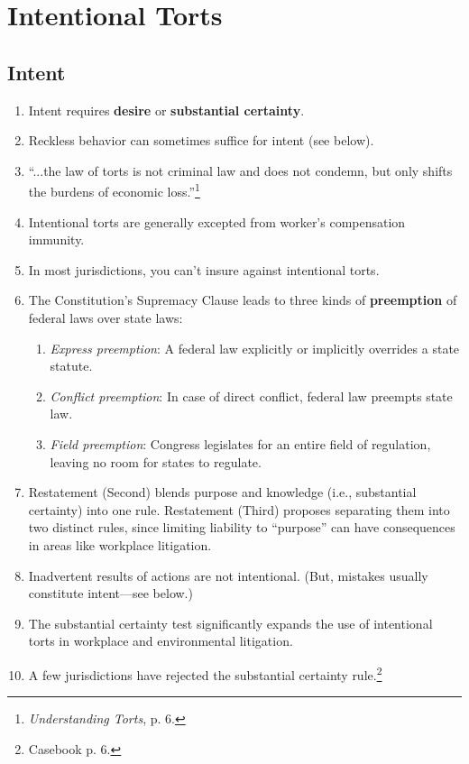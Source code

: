 \section{Intentional Torts}

\subsection{Intent}

\begin{enumerate}
    \item Intent requires \textbf{desire} or \textbf{substantial certainty}.
    \item Reckless behavior can sometimes suffice for intent (see below). 
    \item ``...the law of torts is not criminal law and does not condemn, but 
    only shifts the burdens of economic loss.''\footnote{\emph{Understanding 
    Torts}, p. 6.}
    \item Intentional torts are generally excepted from worker's 
    compensation immunity.
    \item In most jurisdictions, you can't insure against intentional 
    torts.
    \item The Constitution's Supremacy Clause leads to three kinds of 
    \textbf{preemption} of federal laws over state laws:
    \begin{enumerate}
        \item \emph{Express preemption}: A federal law explicitly or 
        implicitly overrides a state statute.
        \item \emph{Conflict preemption}: In case of direct conflict, 
        federal law preempts state law.
        \item \emph{Field preemption}: Congress legislates for an entire 
        field of regulation, leaving no room for states to regulate.
    \end{enumerate}
    \item Restatement (Second) blends purpose and knowledge (i.e., substantial 
    certainty) into one rule. Restatement (Third) proposes separating them 
    into two distinct rules, since limiting liability to ``purpose'' can have 
    consequences in areas like workplace litigation.
    \item Inadvertent results of actions are not intentional. (But, 
    mistakes usually constitute intent---see below.) %
    \item The substantial certainty test significantly expands the use of 
    intentional torts in workplace and environmental litigation.
    \item A few jurisdictions have rejected the substantial certainty 
    rule.\footnote{Casebook p. 6.}
\end{enumerate}

